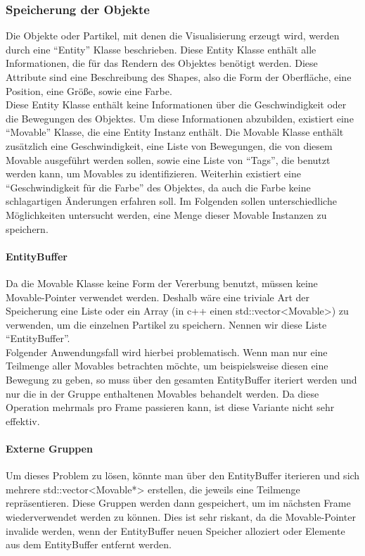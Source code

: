 \documentclass[11pt,a4paper]{article}
\begin{document}
\subsubsection*{Speicherung der Objekte}
Die Objekte oder Partikel, mit denen die Visualisierung erzeugt wird, werden durch eine ``Entity'' Klasse beschrieben. Diese Entity Klasse enthält alle Informationen, die für das Rendern des Objektes benötigt werden. Diese Attribute sind eine Beschreibung des Shapes, also die Form der Oberfläche, eine Position, eine Größe, sowie eine Farbe.\\
Diese Entity Klasse enthält keine Informationen über die Geschwindigkeit oder die Bewegungen des Objektes. Um diese Informationen abzubilden, existiert eine ``Movable'' Klasse, die eine Entity Instanz enthält. Die Movable Klasse enthält zusätzlich eine Geschwindigkeit, eine Liste von Bewegungen, die von diesem Movable ausgeführt werden sollen, sowie eine Liste von ``Tags'', die benutzt werden kann, um Movables zu identifizieren. Weiterhin existiert eine ``Geschwindigkeit für die Farbe''  des Objektes, da auch die Farbe keine schlagartigen Änderungen erfahren soll. Im Folgenden sollen unterschiedliche Möglichkeiten untersucht werden, eine Menge dieser Movable Instanzen zu speichern.
\paragraph{EntityBuffer}
Da die Movable Klasse keine Form der Vererbung benutzt, müssen keine Movable-Pointer verwendet werden. Deshalb wäre eine triviale Art der Speicherung eine Liste oder ein Array (in c++ einen std::vector<Movable>) zu verwenden, um die einzelnen Partikel zu speichern. Nennen wir diese Liste ``EntityBuffer''.\\
Folgender Anwendungsfall wird hierbei problematisch. Wenn man nur eine Teilmenge aller Movables betrachten möchte, um beispielsweise diesen eine Bewegung zu geben, so muss über den gesamten EntityBuffer iteriert werden und nur die in der Gruppe enthaltenen Movables behandelt werden. Da diese Operation mehrmals pro Frame passieren kann, ist diese Variante nicht sehr effektiv.
\paragraph{Externe Gruppen}
Um dieses Problem zu lösen, könnte man über den EntityBuffer iterieren und sich mehrere std::vector<Movable*> erstellen, die jeweils eine Teilmenge repräsentieren. Diese Gruppen werden dann gespeichert, um im nächsten Frame wiederverwendet werden zu können. Dies ist sehr riskant, da die Movable-Pointer invalide werden, wenn der EntityBuffer neuen Speicher alloziert oder Elemente aus dem EntityBuffer entfernt werden.
\end{document}
